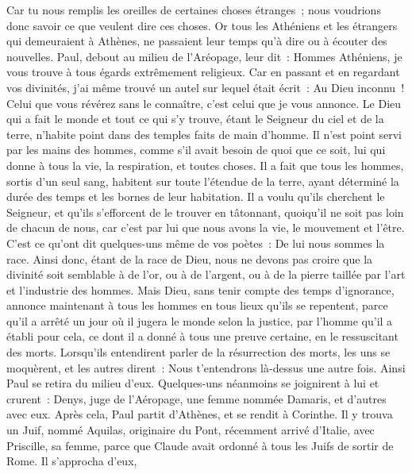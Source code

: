 \begin{multicols}{2}
Car tu nous remplis les oreilles de certaines choses étranges~; nous voudrions donc savoir ce que veulent dire ces choses.
Or tous les Athéniens et les étrangers qui demeuraient à Athènes, ne passaient leur temps qu'à dire ou à écouter des nouvelles.
Paul, debout au milieu de l'Aréopage, leur dit~: Hommes Athéniens, je vous trouve à tous égards extrêmement religieux.
Car en passant et en regardant vos divinités, j'ai même trouvé un autel sur lequel était écrit~: Au Dieu inconnu~! Celui que vous révérez sans le connaître, c'est celui que je vous annonce.
Le Dieu qui a fait le monde et tout ce qui s'y trouve, étant le Seigneur du ciel et de la terre, n'habite point dans des temples faits de main d'homme.
Il n'est point servi par les mains des hommes, comme s'il avait besoin de quoi que ce soit, lui qui donne à tous la vie, la respiration, et toutes choses.
Il a fait que tous les hommes, sortis d'un seul sang, habitent sur toute l'étendue de la terre, ayant déterminé la durée des temps et les bornes de leur habitation.
Il a voulu qu'ils cherchent le Seigneur, et qu'ils s'efforcent de le trouver en tâtonnant, quoiqu'il ne soit pas loin de chacun de nous,
car c'est par lui que nous avons la vie, le mouvement et l'être. C'est ce qu'ont dit quelques-uns même de vos poètes~: De lui nous sommes la race.
Ainsi donc, étant de la race de Dieu, nous ne devons pas croire que la divinité soit semblable à de l'or, ou à de l'argent, ou à de la pierre taillée par l'art et l'industrie des hommes.
Mais Dieu, sans tenir compte des temps d'ignorance, annonce maintenant à tous les hommes en tous lieux qu'ils se repentent,
parce qu'il a arrêté un jour où il jugera le monde selon la justice, par l'homme qu'il a établi pour cela, ce dont il a donné à tous une preuve certaine, en le ressuscitant des morts.
Lorsqu'ils entendirent parler de la résurrection des morts, les uns se moquèrent, et les autres dirent~: Nous t'entendrons là-dessus une autre fois.
Ainsi Paul se retira du milieu d'eux.
Quelques-uns néanmoins se joignirent à lui et crurent~: Denys, juge de l'Aéropage, une femme nommée Damaris, et d'autres avec eux.
\VerseOne{}Après cela, Paul partit d'Athènes, et se rendit à Corinthe.
Il y trouva un Juif, nommé Aquilas, originaire du Pont, récemment arrivé d'Italie, avec Priscille, sa femme, parce que Claude avait ordonné à tous les Juifs de sortir de Rome. Il s'approcha d'eux,

\end{multicols}
